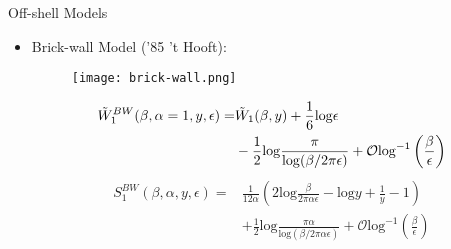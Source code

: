\documentclass{beamer}
\begin{document}
\begin{frame}{Off-shell Models}
    \begin{itemize}
        \item Brick-wall Model {\color{blue}('85 't Hooft)}:
        \begin{figure}
            \centering
            \texttt{[image: brick-wall.png]}
            \label{brick-wall}
        \end{figure}
        \begin{equation*}
        \begin{split}
        \Tilde{W}_1^{BW}(\beta,\alpha=1,y,\epsilon)=&\Tilde{W}_1(\beta,y)+\frac{1}{6}\mathrm{log}\epsilon\\
        &-\frac{1}{2}\mathrm{log}\frac{\pi}{\mathrm{log}(\beta/2\pi\epsilon)}+\mathcal{O}\mathrm{log}^{-1}\left(\frac{\beta}{\epsilon}\right)
        \end{split}
    \end{equation*}
    \begin{equation*}
        \begin{split}
            S^{BW}_1(\beta,\alpha,y,\epsilon)=&\frac{1}{12\alpha}\left(2\mathrm{log}\frac{\beta}{2\pi\alpha\epsilon}-\mathrm{log}y+\frac{1}{y}-1\right)\\
            &+\frac{1}{2}\mathrm{log}\frac{\pi\alpha}{\mathrm{log}(\beta/2\pi\alpha\epsilon)}+\mathcal{O}\mathrm{log}^{-1}\left(\frac{\beta}{\epsilon}\right)
        \end{split}
        \label{entropy}
    \end{equation*}
    \end{itemize}
\end{frame}
\end{document}
